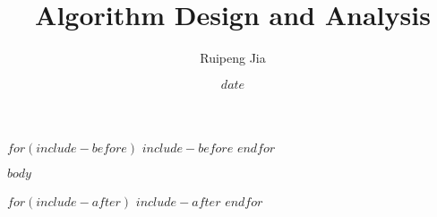 \documentclass{article}
\title{Algorithm Design and Analysis}    \let\Title\@title
\author{Ruipeng Jia}                     \let\Author\@author
\date{$date$}
\begin{document}
\maketitle
$for(include-before)$  %
$include-before$
$endfor$

$body$

$for(include-after)$
$include-after$
$endfor$
\end{document}
